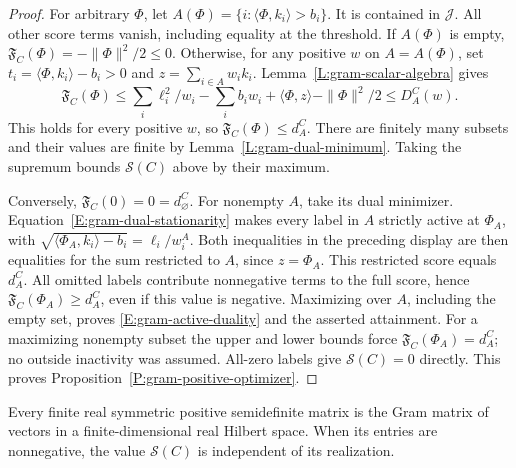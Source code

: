 \begin{proof}
  For arbitrary $\Phi$, let
  $A(\Phi)=\{i:\langle\Phi,k_i\rangle>b_i\}$.
  It is contained in $\mathcal J$.
  All other score terms vanish, including equality at the threshold.
  If $A(\Phi)$ is empty, $\mathfrak F_C(\Phi)=-\|\Phi\|^2/2\le0$.
  Otherwise, for any positive $w$ on $A=A(\Phi)$, set
  $t_i=\langle\Phi,k_i\rangle-b_i>0$ and $z=\sum_{i\in A}w_ik_i$.
  Lemma~\ref{L:gram-scalar-algebra} gives
  \[
    \mathfrak F_C(\Phi)
    \le\sum_i\ell_i^2/w_i-\sum_i b_iw_i
    +\langle\Phi,z\rangle-\|\Phi\|^2/2
    \le D_A^C(w).
  \]
  This holds for every positive $w$, so
  $\mathfrak F_C(\Phi)\le d_A^C$.
  There are finitely many subsets and their values are finite by
  Lemma~\ref{L:gram-dual-minimum}.
  Taking the supremum bounds $\mathscr S(C)$ above by their maximum.

  Conversely, $\mathfrak F_C(0)=0=d_\varnothing^C$.
  For nonempty $A$, take its dual minimizer.
  Equation~\eqref{E:gram-dual-stationarity} makes every label in $A$
  strictly active at $\Phi_A$, with
  $\sqrt{\langle\Phi_A,k_i\rangle-b_i}=\ell_i/w_i^A$.
  Both inequalities in the preceding display are then equalities
  for the sum restricted to $A$, since $z=\Phi_A$.
  This restricted score equals $d_A^C$.
  All omitted labels contribute nonnegative terms to the full score,
  hence $\mathfrak F_C(\Phi_A)\ge d_A^C$, even if this value is negative.
  Maximizing over $A$, including the empty set, proves
  \eqref{E:gram-active-duality} and the asserted attainment.
  For a maximizing nonempty subset the upper and lower bounds force
  $\mathfrak F_C(\Phi_A)=d_A^C$; no outside inactivity was assumed.
  All-zero labels give $\mathscr S(C)=0$ directly.
  This proves Proposition~\ref{P:gram-positive-optimizer}.
\end{proof}

\begin{lemma}\label{L:gram-realization}
  Every finite real symmetric positive semidefinite matrix is the Gram
  matrix of vectors in a finite-dimensional real Hilbert space.
  When its entries are nonnegative, the value $\mathscr S(C)$ is
  independent of its realization.
\end{lemma}

